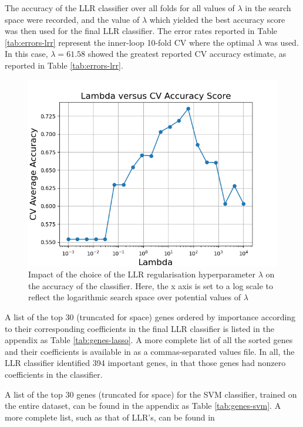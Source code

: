 \documentclass[twocolumn]{article}
\begin{document}
The accuracy of the LLR classifier over all folds for all values of $\lambda$ in the search space were recorded, and the value of $\lambda$ which yielded the best accuracy score was then used for the final LLR classifier. The error rates reported in Table \ref{tab:errors-lrr} represent the inner-loop 10-fold CV where the optimal $\lambda$ was used. In this case, $\lambda=61.58$ showed the greatest reported CV accuracy estimate, as reported in Table \ref{tab:errors-lrr}.

\begin{figure}[H]
    \centering
    \includegraphics[width=\linewidth]{figures/Lambda_versus_CV_Accuracy_Score.png}
    \caption{Impact of the choice of the LLR regularisation hyperparameter $\lambda$ on the accuracy of the classifier. Here, the x axis is set to a log scale to reflect the logarithmic search space over potential values of $\lambda$}
    \label{fig:lambda-search}
\end{figure}

A list of the top 30 (truncated for space) genes ordered by importance according to their corresponding coefficients in the final LLR classifier is listed in the appendix as Table \ref{tab:genes-lasso}. A more complete list of all the sorted genes and their coefficients is available in  as a commas-separated values file. In all, the LLR classifier identified 394 important genes, in that those genes had nonzero coefficients in the classifier.

A list of the top 30 genes (truncated for space) for the SVM classifier, trained on the entire dataset, can be found in the appendix as Table \ref{tab:genes-svm}. A more complete list, such as that of LLR's, can be found in 
\end{document}

